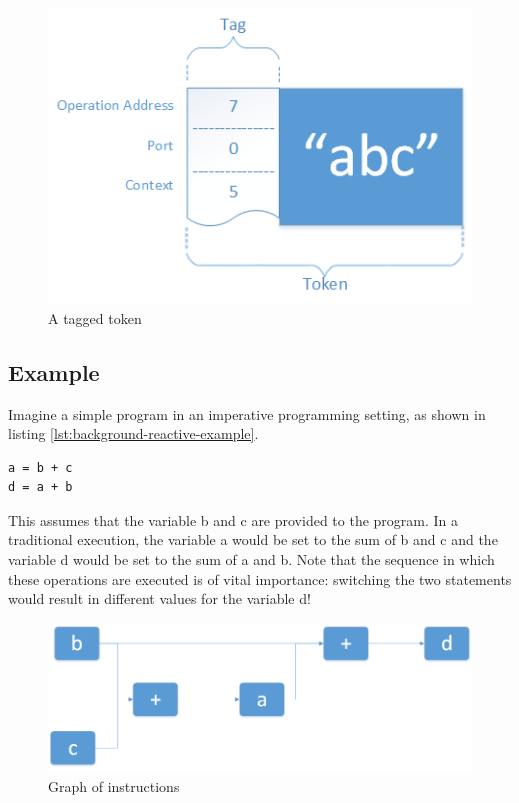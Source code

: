 \begin{figure}[ht]
	\centerline{\includegraphics[width=\textwidth]{images/background-dataflow-token.png}}
	\caption{A tagged token}
	\label{fig:background-dataflow-token}
\end{figure}

\subsection{Example}

Imagine a simple program in an imperative programming setting, as shown in listing \ref{lst:background-reactive-example}.

\begin{lstlisting}[caption={A basic data flow program},captionpos=b,label={lst:background-dataflow-example}]
a = b + c
d = a + b
\end{lstlisting}

This assumes that the variable b and c are provided to the program.
In a traditional execution, the variable a would be set to the sum of b and c and the variable d would be set to the sum of a and b. Note that the sequence in which these operations are executed is of vital importance: switching the two statements would result in different values for the variable d!

\begin{figure}[ht]
    \centerline{\includegraphics[width=\textwidth]{images/background-dataflow-example.png}}
	\caption{Graph of instructions}
	\label{fig:background-dataflow-example}
\end{figure}

